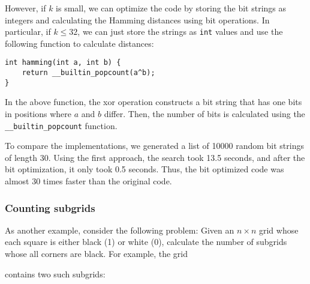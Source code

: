 However, if $k$ is small, we can optimize the code
by storing the bit strings as integers and
calculating the Hamming distances using bit operations.
In particular, if $k \le 32$, we can just store
the strings as \texttt{int} values and use the
following function to calculate distances:
\begin{lstlisting}
int hamming(int a, int b) {
    return __builtin_popcount(a^b);
}
\end{lstlisting}
In the above function, the xor operation constructs
a bit string that has one bits in positions
where $a$ and $b$ differ.
Then, the number of bits is calculated using
the \texttt{\_\_builtin\_popcount} function.

To compare the implementations, we generated
a list of 10000 random bit strings of length 30.
Using the first approach, the search took
13.5 seconds, and after the bit optimization,
it only took 0.5 seconds.
Thus, the bit optimized code was almost
30 times faster than the original code.

\subsubsection{Counting subgrids}

As another example, consider the
following problem:
Given an $n \times n$ grid whose
each square is either black (1) or white (0),
calculate the number of subgrids
whose all corners are black.
For example, the grid
\begin{center}
\end{center}
contains two such subgrids:
\begin{center}
\end{center}

